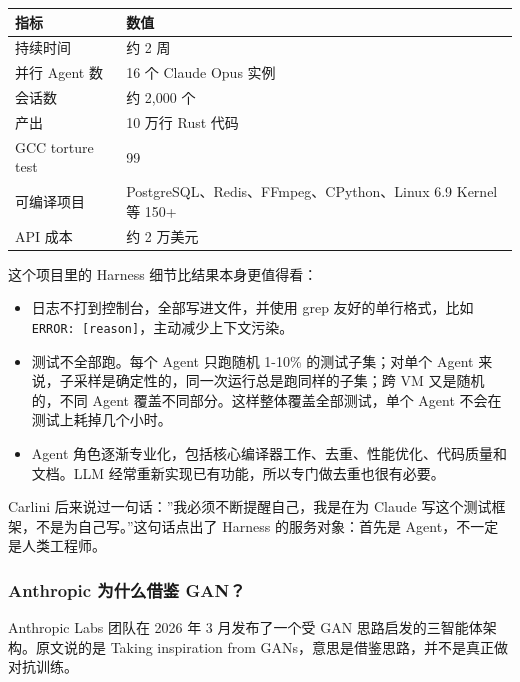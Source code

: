 \documentclass[9pt,a4paper,twocolumn]{ctexart}
\begin{document}
{\footnotesize
\begin{tabular}{|p{}|p{}|}
\hline
\textbf{指标} & \textbf{数值} \\
\hline
持续时间 & 约 2 周 \\
\hline
并行 Agent 数 & 16 个 Claude Opus 实例 \\
\hline
会话数 & 约 2,000 个 \\
\hline
产出 & 10 万行 Rust 代码 \\
\hline
GCC torture test & 99\\%
\hline
可编译项目 & PostgreSQL、Redis、FFmpeg、CPython、Linux 6.9 Kernel 等 150+ \\
\hline
API 成本 & 约 2 万美元 \\
\hline
\end{tabular}
}



这个项目里的 Harness 细节比结果本身更值得看：


\begin{itemize}[itemsep=1pt, topsep=2pt]
  \item 日志不打到控制台，全部写进文件，并使用 grep 友好的单行格式，比如 \texttt{ERROR: [reason]}，主动减少上下文污染。
  \item 测试不全部跑。每个 Agent 只跑随机 1-10\% 的测试子集；对单个 Agent 来说，子采样是确定性的，同一次运行总是跑同样的子集；跨 VM 又是随机的，不同 Agent 覆盖不同部分。这样整体覆盖全部测试，单个 Agent 不会在测试上耗掉几个小时。
  \item Agent 角色逐渐专业化，包括核心编译器工作、去重、性能优化、代码质量和文档。LLM 经常重新实现已有功能，所以专门做去重也很有必要。
\end{itemize}


Carlini 后来说过一句话：”我必须不断提醒自己，我是在为 Claude 写这个测试框架，不是为自己写。”这句话点出了 Harness 的服务对象：首先是 Agent，不一定是人类工程师。



\subsubsection{Anthropic 为什么借鉴 GAN？}


Anthropic Labs 团队在 2026 年 3 月发布了一个受 GAN 思路启发的三智能体架构。原文说的是 Taking inspiration from GANs，意思是借鉴思路，并不是真正做对抗训练。
\end{document}
